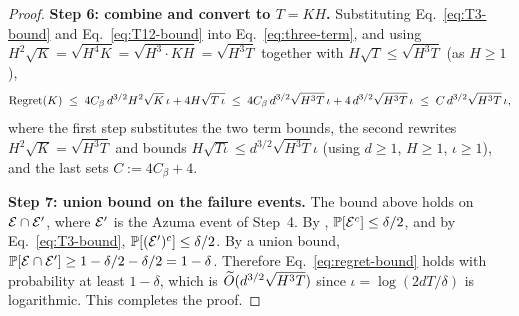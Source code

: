 \begin{proof}
\smallskip\noindent\textbf{Step 6: combine and convert to $T=KH$.}
Substituting Eq.~\eqref{eq:T3-bound} and Eq.~\eqref{eq:T12-bound} into
Eq.~\eqref{eq:three-term}, and using $H^2\sqrt K=\sqrt{H^4 K}=\sqrt{H^3\cdot KH}=\sqrt{H^3 T}$
together with $H\sqrt{T}\le\sqrt{H^3 T}$
(as $H\ge1$),
\begin{align*}
\mathrm{Regret}(K)
\;\le\; 4 C_\beta\, d^{3/2} H^2\sqrt{K}\,\iota + 4H\sqrt{T\,\iota}
\;\le\; 4 C_\beta\, d^{3/2}\sqrt{H^3 T}\,\iota + 4\,d^{3/2}\sqrt{H^3 T}\,\iota
\;\le\; C\, d^{3/2}\sqrt{H^3 T}\,\iota,
\end{align*}
where the first step substitutes the two term bounds, the second rewrites
$H^2\sqrt K=\sqrt{H^3 T}$ and bounds $H\sqrt{T\iota}\le d^{3/2}\sqrt{H^3 T}\iota$
(using $d\ge1$, $H\ge1$, $\iota\ge1$), and the last sets $C:=4C_\beta+4$.

\smallskip\noindent\textbf{Step 7: union bound on the failure events.}
The bound above holds on $\mathcal{E}\cap\mathcal{E}'$, where $\mathcal{E}'$ is the Azuma event of
Step~4. By , $\mathbb{P}[\mathcal{E}^c]\le\delta/2$, and by
Eq.~\eqref{eq:T3-bound}, $\mathbb{P}[(\mathcal{E}')^c]\le\delta/2$. By a union bound,
$\mathbb{P}[\mathcal{E}\cap\mathcal{E}']\ge 1-\delta/2-\delta/2=1-\delta$. Therefore
Eq.~\eqref{eq:regret-bound} holds with probability at least $1-\delta$, which is
$\widetilde{O}(d^{3/2}\sqrt{H^3 T})$ since $\iota=\log(2dT/\delta)$ is logarithmic. This
completes the proof.
\end{proof}
